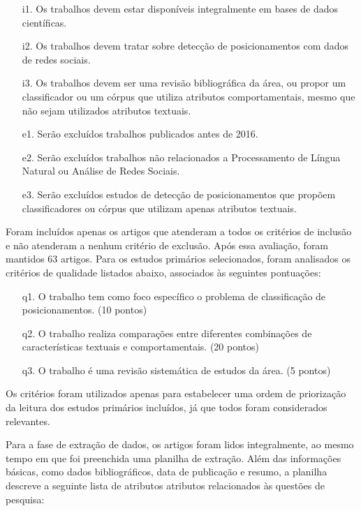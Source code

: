 \documentclass[
	12pt, oneside, a4paper, english, brazil
]{abntex2ppgsi}
\begin{document}
\begin{enumerate}
    \item[i1.] Os trabalhos devem estar disponíveis integralmente em bases de dados científicas.
    \item[i2.] Os trabalhos devem tratar sobre detecção de posicionamentos com dados de redes sociais.
    \item[i3.] Os trabalhos devem ser uma revisão bibliográfica da área, ou propor um classificador ou um córpus que utiliza atributos comportamentais, mesmo que não sejam utilizados atributos textuais.
    \item[e1.] Serão excluídos trabalhos publicados antes de 2016.
    \item[e2.] Serão excluídos trabalhos não relacionados a Processamento de Língua Natural ou Análise de Redes Sociais.
    \item[e3.] Serão excluídos estudos de detecção de posicionamentos que propõem classificadores ou córpus que utilizam apenas atributos textuais.
\end{enumerate}

Foram incluídos apenas os artigos que atenderam a todos os critérios de inclusão e não atenderam a nenhum critério de exclusão. Após essa avaliação, foram mantidos 63 artigos. Para os estudos primários selecionados, foram analisados os critérios de qualidade listados abaixo, associados às seguintes pontuações:

\begin{enumerate}
    \item[q1.] O trabalho tem como foco específico o problema de classificação de posicionamentos. (10 pontos)
    \item[q2.] O trabalho realiza comparações entre diferentes combinações de características textuais e comportamentais. (20 pontos)
    \item[q3.] O trabalho é uma revisão sistemática de estudos da área. (5 pontos)
\end{enumerate}

Os critérios foram utilizados apenas para estabelecer uma ordem de priorização da leitura dos estudos primários incluídos, já que todos foram considerados relevantes.

Para a fase de extração de dados, os artigos foram lidos integralmente, ao mesmo tempo em que foi preenchida uma planilha de extração. Além das informações básicas, como dados bibliográficos, data de publicação e resumo, a planilha descreve a seguinte lista de atributos atributos relacionados às questões de pesquisa:
\end{document}
